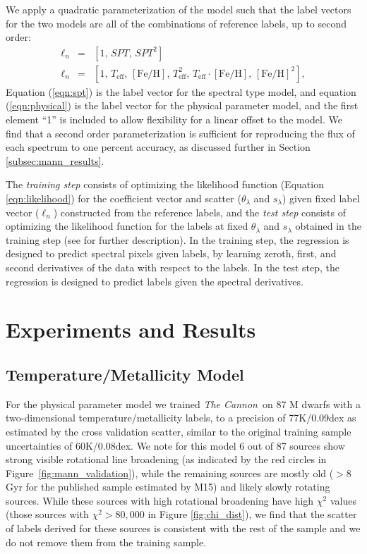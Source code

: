 \documentclass[modern]{aastex62}
\newcommand{\thecannon}{\textsl{The Cannon}}
\newcommand{\teff}{T_{\mathrm{eff}}}
\newcommand{\feh}{[{\mathrm{Fe}/\mathrm{H}}]}
\begin{document}
We apply a quadratic parameterization of the model such that the label vectors for the two models are all of the combinations of reference labels, up to second order:
\begin{eqnarray}
\ell_{n} &=& [1, \, SPT, \, SPT^{2}] \label{eqn:spt}
\\
\ell_{n} &=& [1, \, \teff, \, \feh, \, \teff^2, \, \teff \cdot \feh, \, \feh^{2}] \label{eqn:physical}
,
\end{eqnarray}
Equation (\ref{eqn:spt}) is the label vector for the spectral type model, and equation (\ref{eqn:physical}) is the label vector for the physical parameter model, and the first element ``1'' is included to allow flexibility for a linear offset to the model. We find that a second order parameterization is sufficient for reproducing the flux of each spectrum to one percent accuracy, as discussed further in Section \ref{subsec:mann_results}.

The \emph{training step} consists of optimizing the likelihood function (Equation \ref{eqn:likelihood}) for the coefficient vector and scatter ($\theta_{\lambda}$ and $s_{\lambda}$) given fixed label vector (\emph{$\ell_n$}) constructed from the reference labels, and the \emph{test step} consists of optimizing the likelihood function for the labels at fixed $\theta_{\lambda}$ and $s_{\lambda}$ obtained in the training step (see \citealt{Ness:2015} for further description). 
In the training step, the regression is designed to predict spectral pixels
given labels, by learning zeroth, first, and second derivatives of the data with respect to
the labels. In the test step, the regression is designed to predict labels given the spectral
derivatives.

\section{Experiments and Results} \label{sec:results}

\subsection{Temperature/Metallicity Model \label{subsec:mann_results}}
For the physical parameter model we trained \thecannon\ on 87 M dwarfs with a two-dimensional temperature/metallicity labels, to a precision of 77K/0.09dex as estimated by the cross validation scatter, similar to the original training sample uncertainties of 60K/0.08dex. We note for this model 6 out of 87 sources show strong visible rotational line broadening (as indicated by the red circles in Figure~\ref{fig:mann_validation}), while the remaining sources are mostly old ($>8$ Gyr for the published sample estimated by M15) and likely slowly rotating sources. While these sources with high rotational broadening have high $\chi^2$ values (those sources with $\chi^2 > 80,000$ in Figure \ref{fig:chi_dist}), we find that the scatter of labels derived for these sources is consistent with the rest of the sample and we do not remove them from the training sample.
\end{document}

